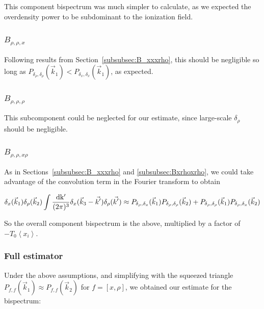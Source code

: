 This component bispectrum was much simpler to calculate, as we expected the overdensity power to be subdominant to the ionization field.

\subsubsection*{$B_{\rho,\rho,x}$}
\label{subsubsec:Brhorhox}
Following results from Section~\ref{subsubsec:B_xxxrho}, this should be negligible so long as $P_{\delta_{\rho},\delta_{\rho}}(\vec{k}_1) < P_{\delta_{x},\delta_{x}}(\vec{k}_1)$, as expected.

\subsubsection*{$B_{\rho,\rho,\rho}$}
\label{subsubsec:Brhorhorho}
This subcomponent could be neglected for our estimate, since large-scale $\delta_{\rho}$ should be negligible.

\subsubsection*{$B_{\rho,\rho,x\rho}$}
\label{subsubsec:Brhorhoxrho}

As in Sections~\ref{subsubsec:B_xxxrho} and \ref{subsubsec:Bxrhoxrho}, we could take advantage of the convolution term in the Fourier transform to obtain

\begin{equation}
\delta_x(\vec{k}_1)\delta_{\rho}(\vec{k}_2) \int \frac{\rm{d}k'}{(2\pi)^3}\delta_x(\vec{k}_3-\vec{k'})\delta_{\rho}(\vec{k'})
\approx
P_{\delta_{\rho},\delta_x}(\vec{k}_1)P_{\delta_{\rho},\delta_{\rho}}(\vec{k}_2) + P_{\delta_{\rho},\delta_{\rho}}(\vec{k}_1)P_{\delta_{\rho},\delta_x}(\vec{k}_2)
\end{equation}

So the overall component bispectrum is the above, multiplied by a factor of $-T_0\left\langle x_i \right\rangle$.

\subsubsection{Full estimator}

Under the above assumptions, and simplifying with the squeezed triangle $P_{f,f}(\vec{k}_1)\approx P_{f,f}(\vec{k}_2)$ for $f=[x,\rho]$, we obtained our estimate for the bispectrum:

